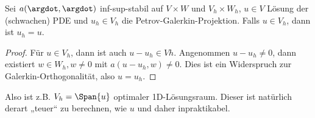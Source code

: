 
\begin{kor} \label{3.49}
	Sei $a(\argdot, \argdot)$ inf-sup-stabil auf $V \times W$ und $V_h \times W_h$, $u \in V$ Lösung der (schwachen) PDE und $u_h \in V_h$ die Petrov-Galerkin-Projektion.
	Falls $u \in V_h$, dann ist $u_h = u$.
	\begin{proof}
		Für $u \in V_h$, dann ist auch $u - u_h \in Vh$.
		Angenommen $u - u_h \neq 0$, dann existiert $w \in W_h, w \neq 0$ mit
		\begin{math}
			a(u-u_h, w) \neq 0.
		\end{math}
		Dies ist ein Widerspruch zur Galerkin-Orthogonalität, also $u = u_h$.
	\end{proof}
	\begin{note}
		Also ist z.B. $V_h = \Span{u}$ optimaler 1D-Lösungsraum.
		Dieser ist natürlich derart „teuer“ zu berechnen, wie $u$ und daher inpraktikabel.
	\end{note}
\end{kor}

